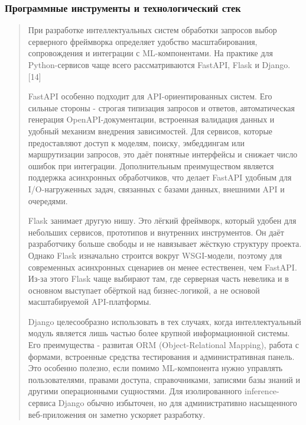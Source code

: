 \hypertarget{ux43fux440ux43eux433ux440ux430ux43cux43cux43dux44bux435-ux438ux43dux441ux442ux440ux443ux43cux435ux43dux442ux44b-ux438-ux442ux435ux445ux43dux43eux43bux43eux433ux438ux447ux435ux441ux43aux438ux439-ux441ux442ux435ux43a}{%
\subsubsection{Программные инструменты и технологический
стек}\label{ux43fux440ux43eux433ux440ux430ux43cux43cux43dux44bux435-ux438ux43dux441ux442ux440ux443ux43cux435ux43dux442ux44b-ux438-ux442ux435ux445ux43dux43eux43bux43eux433ux438ux447ux435ux441ux43aux438ux439-ux441ux442ux435ux43a}}

\begin{quote}
При разработке интеллектуальных систем обработки запросов выбор
серверного фреймворка определяет удобство масштабирования, сопровождения
и интеграции с ML-компонентами. На практике для Python-сервисов чаще
всего рассматриваются FastAPI, Flask и Django.{[}14{]}

FastAPI особенно подходит для API-ориентированных систем. Его сильные
стороны - строгая типизация запросов и ответов, автоматическая генерация
OpenAPI-документации, встроенная валидация данных и удобный механизм
внедрения зависимостей. Для сервисов, которые предоставляют доступ к
моделям, поиску, эмбеддингам или маршрутизации запросов, это даёт
понятные интерфейсы и снижает число ошибок при интеграции.
Дополнительным преимуществом является поддержка асинхронных
обработчиков, что делает FastAPI удобным для I/O-нагруженных задач,
связанных с базами данных, внешними API и очередями.

Flask занимает другую нишу. Это лёгкий фреймворк, который удобен для
небольших сервисов, прототипов и внутренних инструментов. Он даёт
разработчику больше свободы и не навязывает жёсткую структуру проекта.
Однако Flask изначально строится вокруг WSGI-модели, поэтому для
современных асинхронных сценариев он менее естественен, чем FastAPI.
Из-за этого Flask чаще выбирают там, где серверная часть невелика и в
основном выступает обёрткой над бизнес-логикой, а не основой
масштабируемой API-платформы.

Django целесообразно использовать в тех случаях, когда интеллектуальный
модуль является лишь частью более крупной информационной системы. Его
преимущества - развитая ORM (Object-Relational Mapping), работа с
формами, встроенные средства тестирования и административная панель. Это
особенно полезно, если помимо ML-компонента нужно управлять
пользователями, правами доступа, справочниками, записями базы знаний и
другими операционными сущностями. Для изолированного inference-сервиса
Django обычно избыточен, но для административно насыщенного
веб-приложения он заметно ускоряет разработку.


\end{quote}
